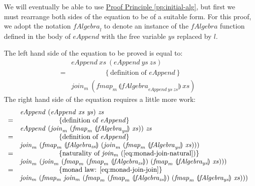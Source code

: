 \documentclass{jfp1}
\newcommand{\fold}[1]{\llparenthesis #1 \rrparenthesis}
\newcommand{\eqAnnotation}[1]{\hspace{2cm}\left\{\textrm{#1}\right\}}
\newcommand{\proofprinref}[1]{\hyperref[#1]{Proof Principle \ref*{#1}}}
\begin{document}
\begin{proof*}
  We will eventually be able to use \proofprinref{pp:initial-alg}, but
  first we must rearrange both sides of the equation to be of a
  suitable form. For this proof, we adopt the notation
  $\mathit{fAlgebra}_l$ to denote an instance of the
  $\mathit{fAlgebra}$ function defined in the body of
  $\mathit{eAppend}$ with the free variable $\mathit{ys}$ replaced by
  $l$.

  The left hand side of the equation to be proved is equal to:
  \begin{displaymath}
    \begin{array}{cl}
       &\mathit{eAppend}~\mathit{xs}~(\mathit{eAppend}~\mathit{ys}~\mathit{zs}) \\
       =&\eqAnnotation{definition of $\mathit{eAppend}$} \\
       &\mathit{join_m}~(\mathit{fmap_m}~\fold{\mathit{fAlgebra}_{\mathit{eAppend}~\mathit{ys}~\mathit{zs}}}~\mathit{xs})
    \end{array}
  \end{displaymath}
  The right hand side of the equation requires a little more work:
  \begin{displaymath}
    \begin{array}{cl}
      &\mathit{eAppend}~(\mathit{eAppend}~\mathit{xs}~\mathit{ys})~\mathit{zs} \\
      =&\eqAnnotation{definition of $\mathit{eAppend}$} \\
      &\mathit{eAppend}~(\mathit{join}_m~(\mathit{fmap}_m~\fold{\mathit{fAlgebra}_{\mathit{ys}}}~\mathit{xs}))~\mathit{zs} \\
      =&\eqAnnotation{definition of $\mathit{eAppend}$} \\
      &\mathit{join}_m~(\mathit{fmap}_m~\fold{\mathit{fAlgebra_{zs}}}~(\mathit{join}_m~(\mathit{fmap}_m~\fold{\mathit{fAlgebra}_{\mathit{ys}}}~\mathit{xs}))) \\
      =&\eqAnnotation{naturality of $\mathit{join_m}$ (\autoref{eq:monad-join-natural})} \\
      &\mathit{join}_m~(\mathit{join}_m~(\mathit{fmap}_m~(\mathit{fmap}_m~\fold{\mathit{fAlgebra_{zs}}})~(\mathit{fmap}_m~\fold{\mathit{fAlgebra_{ys}}}~\mathit{xs}))) \\
      =&\eqAnnotation{monad law: 
\autoref{eq:monad-join-join}} \\
      &\mathit{join_m}~(\mathit{fmap_m}~\mathit{join_m}~(\mathit{fmap}_m~(\mathit{fmap}_m~\fold{\mathit{fAlgebra_{zs}}})~(\mathit{fmap}_m~\fold{\mathit{fAlgebra_{ys}}}~\mathit{xs}))) \\

\end{array}
\end{displaymath}
\end{proof*}
\end{document}
